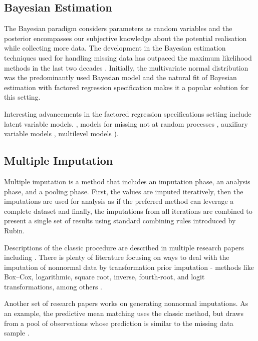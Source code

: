 \documentclass[11pt,a4paper]{article}
\begin{document}
\subsection{Bayesian Estimation}

The Bayesian paradigm considers parameters as random variables and the posterior encompasses our subjective knowledge about the potential realisation while collecting more data. The development in the Bayesian estimation techniques used for handling missing data has outpaced the maximum likelihood methods in the last two decades \cite{enders_missing_2023}. Initially, the multivariate normal distribution was the predominantly used Bayesian model and the natural fit of Bayesian estimation with factored regression specification makes it a popular solution for this setting. 

Interesting advancements in the factored regression specifications setting include latent variable models. \cite{ludtke2020regression,kellerblimp,merkle2015blavaan}, models for missing not at random processes \cite{du2022bayesian}, auxiliary variable models \cite{daniels2014fully}, multilevel models \cite{grund2016multiple, enders2020model}). 

\subsection{Multiple Imputation}

Multiple imputation \cite{rubin1976inference} is a method that includes an imputation phase, an analysis phase, and a pooling phase. First, the values are imputed iteratively, then the imputations are used for analysis as if the preferred method can leverage a complete dataset and finally, the imputations from all iterations are combined to present a single set of results using standard combining rules introduced by Rubin.

Descriptions of the classic procedure are described in multiple research papers including \cite{schafer_missing_2002}. There is plenty of literature focusing on ways to deal with the imputation of nonnormal data by transformation prior imputation - methods like Box–Cox, logarithmic, square root, inverse, fourth-root, and logit transformations, among others \cite{enders_missing_2023, van2018flexible, von2009impute, lee2017multiple}. \cite{enders_missing_2023}

Another set of research papers works on generating nonnormal imputations. As an example, the predictive mean matching uses the classic method, but draws from a pool of observations whose prediction is similar to the missing data sample \cite{van2018flexible, kleinke2017multiple}. 
\end{document}
